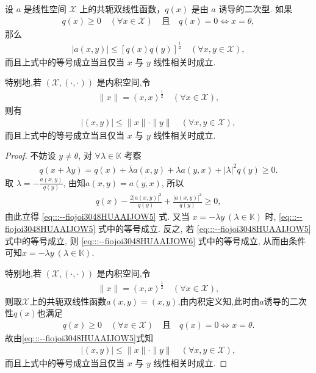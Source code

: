 \documentclass[../../main.tex]{subfiles}%
\begin{document}
\begin{theorem}\label{theorem:泛函分析--Cauchy-Schwarz不等式}
设 $a$ 是线性空间 $\mathscr{X}$ 上的共轭双线性函数，$q(x)$ 是由 $a$ 诱导的二次型. 如果
\begin{align*}
q(x)\geqslant 0\quad(\forall x\in\mathscr{X})\quad\text{且}\quad q(x)=0\iff x=\theta,
\end{align*}
那么
\begin{align}
|a(x,y)|\leqslant [q(x)q(y)]^\frac{1}{2}\quad(\forall x,y\in\mathscr{X}),\label{eq:::--fiojoi3048HUAAIJOW5}
\end{align}
而且上式中的等号成立当且仅当 $x$ 与 $y$ 线性相关时成立.

特别地,若 $(\mathscr{X},(\cdot,\cdot))$ 是内积空间,令
\begin{align*}
\|x\|=(x,x)^\frac{1}{2}\quad(\forall x\in\mathscr{X}),
\end{align*}
则有
\begin{align*}
|(x,y)|\leqslant\|x\|\cdot\|y\|\quad(\forall x,y\in\mathscr{X}),
\end{align*}
而且上式中的等号成立当且仅当 $x$ 与 $y$ 线性相关时成立.
\end{theorem}
\begin{proof}

不妨设 $y\neq\theta$, 对 $\forall\lambda\in\mathbb{K}$ 考察
\begin{align}
q(x+\lambda y)=q(x)+\overline{\lambda}a(x,y)+\lambda a(y,x)+|\lambda|^2q(y)\geqslant 0.\label{eq:::--fiojoi3048HUAAIJOW6}
\end{align}
取 $\lambda=-\frac{a(x,y)}{q(y)}$, 由知$a(x,y)=\overline{a(y,x)}$, 所以
\begin{align*}
q(x)-\frac{2|a(x,y)|^2}{q(y)}+\frac{|a(x,y)|^2}{q(y)}\geqslant 0,
\end{align*}
由此立得 \eqref{eq:::--fiojoi3048HUAAIJOW5} 式. 又当 $x=-\lambda y\ (\lambda\in\mathbb{K})$ 时, \eqref{eq:::--fiojoi3048HUAAIJOW5} 式中的等号成立. 反之, 若 \eqref{eq:::--fiojoi3048HUAAIJOW5} 式中的等号成立, 则 \eqref{eq:::--fiojoi3048HUAAIJOW6} 式中的等号成立, 从而由条件可知$x=-\lambda y\ (\lambda\in\mathbb{K})$.

特别地,若 $(\mathscr{X},(\cdot,\cdot))$ 是内积空间,令
\begin{align*}
\|x\|=(x,x)^\frac{1}{2}\quad(\forall x\in\mathscr{X}),
\end{align*}
则取$\mathscr{X}$上的共轭双线性函数$a(x,y)=(x,y)$,由内积定义知,此时由$a$诱导的二次性$q(x)$也满足
\begin{align*}
q(x)\geqslant 0\quad(\forall x\in\mathscr{X})\quad\text{且}\quad q(x)=0\iff x=\theta.
\end{align*}
故由\eqref{eq:::--fiojoi3048HUAAIJOW5}式知
\begin{align*}
|(x,y)|\leqslant\|x\|\cdot\|y\|\quad(\forall x,y\in\mathscr{X}),
\end{align*}
而且上式中的等号成立当且仅当 $x$ 与 $y$ 线性相关时成立.

\end{proof}
\end{document}
